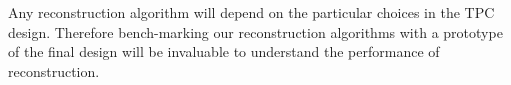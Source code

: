 
Any reconstruction algorithm will depend on the particular choices in the TPC design. 
Therefore bench-marking our reconstruction algorithms with a prototype of the final design will
be invaluable to understand the performance of reconstruction.

